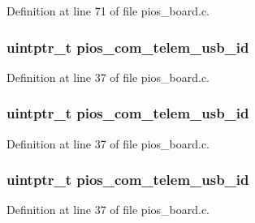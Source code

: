 Definition at line 71 of file pios\-\_\-board.\-c.

\hypertarget{group___open_pilot_core_ga513cc36d72b76de2fcb75ff233a79a4a}{
\subsubsection[{pios\-\_\-com\-\_\-telem\-\_\-usb\-\_\-id}]{\setlength{\rightskip}{0pt plus 5cm}uintptr\-\_\-t pios\-\_\-com\-\_\-telem\-\_\-usb\-\_\-id}}\label{group___open_pilot_core_ga513cc36d72b76de2fcb75ff233a79a4a}


Definition at line 37 of file pios\-\_\-board.\-c.

\hypertarget{group___open_pilot_core_ga513cc36d72b76de2fcb75ff233a79a4a}{
\subsubsection[{pios\-\_\-com\-\_\-telem\-\_\-usb\-\_\-id}]{\setlength{\rightskip}{0pt plus 5cm}uintptr\-\_\-t pios\-\_\-com\-\_\-telem\-\_\-usb\-\_\-id}}\label{group___open_pilot_core_ga513cc36d72b76de2fcb75ff233a79a4a}


Definition at line 37 of file pios\-\_\-board.\-c.

\hypertarget{group___open_pilot_core_ga513cc36d72b76de2fcb75ff233a79a4a}{
\subsubsection[{pios\-\_\-com\-\_\-telem\-\_\-usb\-\_\-id}]{\setlength{\rightskip}{0pt plus 5cm}uintptr\-\_\-t pios\-\_\-com\-\_\-telem\-\_\-usb\-\_\-id}}\label{group___open_pilot_core_ga513cc36d72b76de2fcb75ff233a79a4a}


Definition at line 37 of file pios\-\_\-board.\-c.

